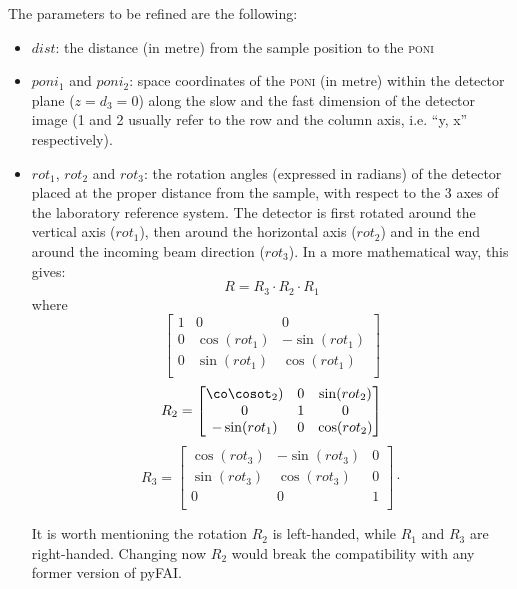 \documentclass[preprint, pdf]{iucr}              %
\begin{document}
The parameters to be refined are the following:
\begin{itemize}
  \item $dist$: the distance (in metre) from the sample position to the
  \textsc{poni}
  \item $poni_1$ and $poni_2$: space coordinates of the
  \textsc{poni} (in metre) within the detector plane ($z=d_3=0$) along the slow
  and the fast dimension of the detector image (1 and 2 usually refer to the row
  and the column axis, i.e. ``y, x'' respectively).
  \item $rot_1$, $rot_2$ and $rot_3$: the
  rotation angles (expressed in radians) of the detector placed at the proper
  distance from the sample, with respect to the 3 axes of the
  laboratory reference system.
  The detector is first rotated around the vertical axis ($rot_1$), then
  around the horizontal axis ($rot_2$) and in the end around the
  incoming beam direction ($rot_3$). In a more mathematical way, this gives:
\begin{equation}
	R = R_3 \cdot R_2 \cdot R_1 
\end{equation}
where
\begin{equation} 	
	\begin{bmatrix}
	1 & 0 & 0\\
	0 & \cos(rot_1) & -\sin(rot_1) \\
	0 & \sin(rot_1) & \cos(rot_1) \\
	\end{bmatrix}
\end{equation}
\begin{equation} 		
	R_2 =
	\begin{bmatrix}
	\co\cosot_2) & 0 & \sin(rot_2) \\
	0 & 1 & 0 \\
	-\sin(rot_1)&0 & \cos(rot_2) \\
	\end{bmatrix}
\end{equation}
\begin{equation} 	
	R_3 =
	\begin{bmatrix}
	\cos(rot_3) & -\sin(rot_3) & 0 \\
	\sin(rot_3) & \cos(rot_3) & 0\\
	0 & 0 & 1\\
	\end{bmatrix}
	\cdot 
\end{equation}

 It is worth mentioning the rotation $R_2$ is left-handed, while $R_1$ and 
 $R_3$ are right-handed. Changing now $R_2$ would break the compatibility with
 any former version of pyFAI.
\end{itemize}
\end{document}
